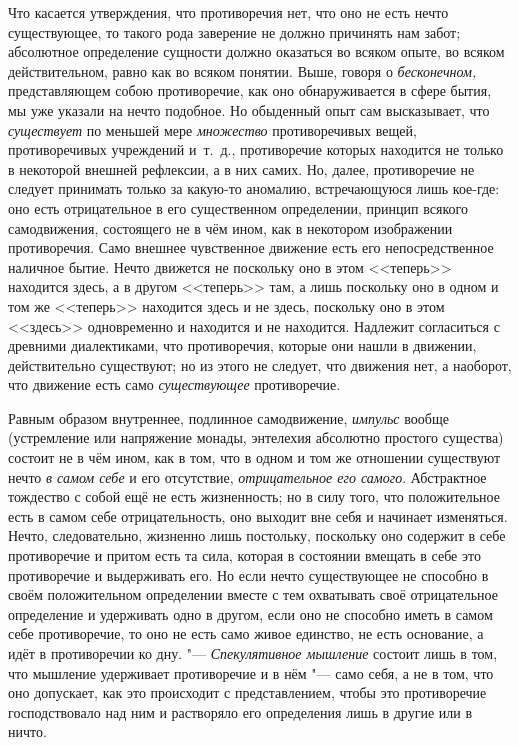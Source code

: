 Что касается утверждения, что противоречия нет, что оно не есть нечто
существующее, то такого рода заверение не должно причинять нам забот;
абсолютное определение сущности должно оказаться во всяком опыте, во всяком
действительном, равно как во всяком понятии. Выше, говоря о
{\em бесконечном,} представляющем собою противоречие,
как оно обнаруживается в сфере бытия, мы уже указали на нечто подобное. Но
обыденный опыт сам высказывает, что {\em существует} по
меньшей мере {\em множество} противоречивых вещей,
противоречивых учреждений и~т.~д., противоречие которых находится не только
в некоторой внешней рефлексии, а в них самих. Но, далее, противоречие не
следует принимать только за какую-то аномалию, встречающуюся лишь кое-где:
оно есть отрицательное в его существенном определении, принцип всякого
самодвижения, состоящего не в чём ином, как в некотором изображении
противоречия. Само внешнее чувственное движение есть его непосредственное
наличное бытие. Нечто движется не поскольку оно в этом <<теперь>> находится
здесь, а в другом <<теперь>> там, а лишь поскольку оно в одном и том же
<<теперь>> находится здесь и не здесь, поскольку оно в этом <<здесь>>
одновременно и находится и не находится. Надлежит согласиться с древними
диалектиками, что противоречия, которые они нашли в движении, действительно
существуют; но из этого не следует, что движения нет, а наоборот, что
движение есть само {\em существующее} противоречие.

Равным образом внутреннее, подлинное самодвижение,
{\em импульс} вообще (устремление или напряжение
монады, энтелехия абсолютно простого существа) состоит не в чём ином, как в
том, что в одном и том же отношении существуют нечто
{\em в самом себе} и его отсутствие,
{\em отрицательное его самого}. Абстрактное тождество с
собой ещё не есть жизненность; но в силу того, что положительное есть в
самом себе отрицательность, оно выходит вне себя и начинает изменяться.
Нечто, следовательно, жизненно лишь постольку, поскольку оно содержит в
себе противоречие и притом есть та сила, которая в состоянии вмещать в себе
это противоречие и выдерживать его. Но если нечто существующее не способно
в своём положительном определении вместе с тем охватывать своё
отрицательное определение и удерживать одно в другом, если оно не способно
иметь в самом себе противоречие, то оно не есть само живое единство, не
есть основание, а идёт в противоречии ко дну. "---
{\em Спекулятивное мышление} состоит лишь в том, что
мышление удерживает противоречие и в нём "--- само себя, а не в том, что оно
допускает, как это происходит с представлением, чтобы это противоречие
господствовало над ним и растворяло его определения лишь в другие или в ничто.

